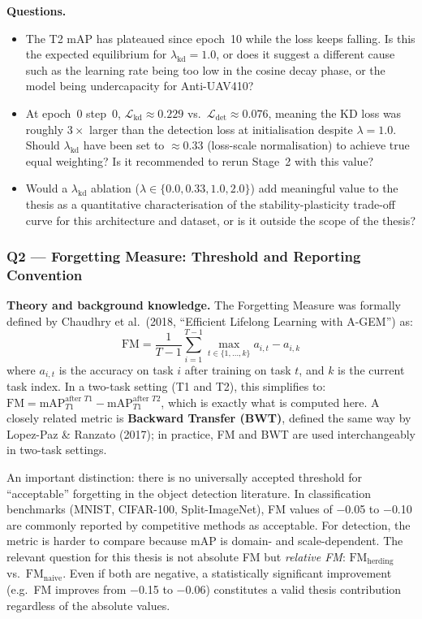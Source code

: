 \textbf{Questions.}
\begin{itemize}
    \item The T2 mAP has plateaued since epoch~10 while the loss
          keeps falling. Is this the expected equilibrium for
          $\lambda_{\text{kd}}=1.0$, or does it suggest a different
          cause such as the learning rate being too low in the
          cosine decay phase, or the model being undercapacity
          for Anti-UAV410?

    \item At epoch~0 step~0, $\mathcal{L}_{\text{kd}} \approx 0.229$
          vs.\ $\mathcal{L}_{\text{det}} \approx 0.076$, meaning
          the KD loss was roughly $3\times$ larger than the detection
          loss at initialisation despite $\lambda=1.0$. Should
          $\lambda_{\text{kd}}$ have been set to $\approx$0.33
          (loss-scale normalisation) to achieve true equal weighting?
          Is it recommended to rerun Stage~2 with this value?

    \item Would a $\lambda_{\text{kd}}$ ablation
          ($\lambda \in \{0.0, 0.33, 1.0, 2.0\}$) add meaningful
          value to the thesis as a quantitative characterisation
          of the stability-plasticity trade-off curve for this
          architecture and dataset, or is it outside the scope
          of the thesis?
\end{itemize}

\subsubsection*{Q2 — Forgetting Measure: Threshold and Reporting Convention}

\textbf{Theory and background knowledge.}
The Forgetting Measure was formally defined by Chaudhry et al.\
(2018, ``Efficient Lifelong Learning with A-GEM'') as:
\[
    \text{FM} = \frac{1}{T-1} \sum_{i=1}^{T-1}
    \max_{t \in \{1,\ldots,k\}} a_{i,t} - a_{i,k}
\]
where $a_{i,t}$ is the accuracy on task $i$ after training on
task $t$, and $k$ is the current task index. In a two-task
setting (T1 and T2), this simplifies to:
$\text{FM} = \text{mAP}_{T1}^{\text{after }T1}
           - \text{mAP}_{T1}^{\text{after }T2}$,
which is exactly what is computed here. A closely related metric
is \textbf{Backward Transfer (BWT)}, defined the same way by
Lopez-Paz \& Ranzato (2017); in practice, FM and BWT are used
interchangeably in two-task settings.

An important distinction: there is no universally accepted threshold
for ``acceptable'' forgetting in the object detection literature.
In classification benchmarks (MNIST, CIFAR-100, Split-ImageNet),
FM values of $-$0.05 to $-$0.10 are commonly reported by competitive
methods as acceptable. For detection, the metric is harder to compare
because mAP is domain- and scale-dependent. The relevant question
for this thesis is not absolute FM but \emph{relative FM}:
$\text{FM}_{\text{herding}}$ vs.\ $\text{FM}_{\text{naive}}$.
Even if both are negative, a statistically significant improvement
(e.g.\ FM improves from $-$0.15 to $-$0.06) constitutes a valid
thesis contribution regardless of the absolute values.

